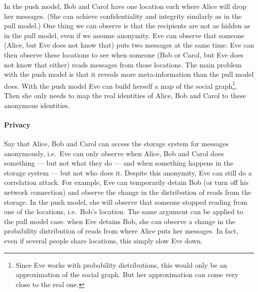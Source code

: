 In the push model, Bob and Carol have one location each where Alice will drop 
her messages.
(She can achieve confidentiality and integrity similarly as in the pull model.)
One thing we can observe is that the recipients are not as hidden as in the 
pull model, even if we assume anonymity.
Eve can observe that someone (Alice, but Eve does not know that) puts two 
messages at the same time.
Eve can then observe these locations to see when someone (Bob or Carol, but Eve
does not know that either) reads messages from those locations.
The main problem with the push model is that it reveals more meta-information 
than the pull model does.
With the push model Eve can build herself a map of the social graph\footnote{%
  Since Eve works with probability distributions, this would only be an 
  approximation of the social graph.
  But her approximation can come very close to the real one.
}.
Then she only needs to map the real identities of Alice, Bob and Carol to these 
anonymous identities.

\paragraph{Privacy}

%
Say that Alice, Bob and Carol can access the storage system for messages 
anonymously, i.e.\ Eve can only observe when Alice, Bob and Carol does 
something --- but not what they do --- and when something happens in the 
storage system --- but not who does it.
Despite this anonymity, Eve can still do a correlation attack.
For example, Eve can temporarily detain Bob (or turn off his network 
connection) and observe the change in the distribution of reads from the 
storage.
In the push model, she will observe that someone stopped reading from one of 
the locations, i.e.\ Bob's location.
The same argument can be applied to the pull model case: when Eve detains Bob, 
she can observe a change in the probability distribution of reads from where 
Alice puts her messages.
In fact, even if several people share locations, this simply slow Eve down.


